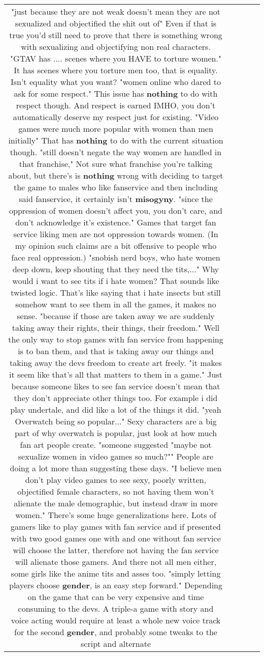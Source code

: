 \documentclass[11pt]{article}
\newlength\mylength
\begin{document}
\begin{center}
\begin{longtable}{|C{.65\mylength}|C{.30\mylength}|C{.12\mylength}|C{.12\mylength}|C{.12\mylength}|}
  \small "just because they are not weak doesn't mean they are not sexualized and objectified the shit out of" Even if that is true you'd still need to prove that there is something wrong with sexualizing and objectifying non real characters. "GTAV has .... scenes where you HAVE to torture women." It has scenes where you torture men too, that is equality. Isn't equality what you want? "women online who dared to ask for some respect." This issue has \textbf{nothing} to do with respect though. And respect is earned IMHO, you don't automatically deserve my respect just for existing. "Video games were much more popular with women than men initially" That has \textbf{nothing} to do with the current situation though. "still doesn't negate the way women are handled in that franchise," Not sure what franchise you're talking about, but there's is \textbf{nothing} wrong with deciding to target the game to males who like fanservice and then including said fanservice, it certainly isn't \textbf{misogyny}. "since the oppression of women doesn't affect you, you don't care, and don't acknowledge it's existence." Games that target fan service liking men are not oppression towards women. (In my opinion such claims are a bit offensive to people who face real oppression.) "snobish nerd boys, who hate women deep down, keep shouting that they need the tits,..." Why would i want to see tits if i hate women? That sounds like twisted logic. That's like saying that i hate insects but still somehow want to see them in all the games, it makes no sense. "because if those are taken away we are suddenly taking away their rights, their things, their freedom." Well the only way to stop games with fan service from happening is to ban them, and that is taking away our things and taking away the devs freedom to create art freely. "it makes it seem like that's all that matters to them in a game." Just because someone likes to see fan service doesn't mean that they don't appreciate other things too. For example i did play undertale, and did like a lot of the things it did. "yeah Overwatch being so popular..." Sexy characters are a big part of why overwatch is popular, just look at how much fan art people create. "someone suggested "maybe not sexualize women in video games so much?"" People are doing a lot more than suggesting these days. "I believe men don't play video games to see sexy, poorly written, objectified female characters, so not having them won't alienate the male demographic, but instead draw in more women." There's some huge generalizations here. Lots of gamers like to play games with fan service and if presented with two good games one with and one without fan service will choose the latter, therefore not having the fan service will alienate those gamers. And there not all men either, some girls like the anime tits and asses too. "simply letting players choose \textbf{gender}, is an easy step forward." Depending on the game that can be very expensive and time consuming to the devs. A triple-a game with story and voice acting would require at least a whole new voice track for the second \textbf{gender}, and probably some tweaks to the script and alternate 
\end{longtable}
\end{center}
\end{document}
